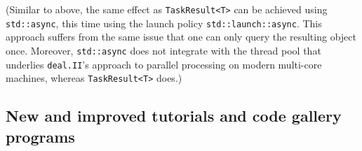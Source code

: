 \documentclass{ansarticle-preprint}
\newcommand{\specialword}[1]{\texttt{#1}}
\newcommand{\dealii}{{\specialword{deal.II}}\xspace}
\begin{document}
\begin{itemize}
    (Similar to above, the same effect as \texttt{TaskResult<T>} can
    be achieved using \texttt{std::async}, this time using the
    launch policy \texttt{std::launch::async}. This approach suffers
    from the same issue that one can only query the resulting object
    once. Moreover, \texttt{std::async} does not integrate with the
    thread pool that underlies \dealii{}'s approach to parallel
    processing on modern multi-core machines, whereas
    \texttt{TaskResult<T>} does.)
\end{itemize}


\subsection{New and improved tutorials and code gallery programs}
\label{subsec:steps}
\end{document}
